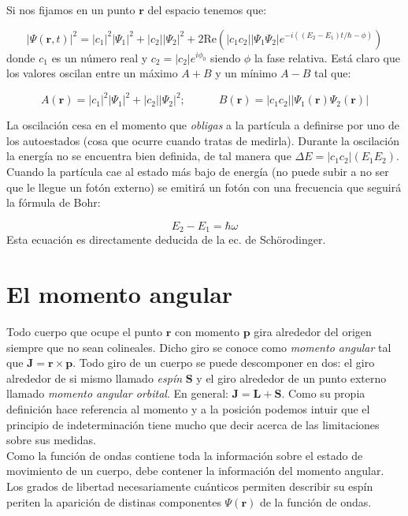 \documentclass[12pt]{article}
\newcommand{\parentesis}[1]{\left( #1  \right)}
\newcommand{\Real}{\mathrm{Re}}
\newcommand{\tquad}{\quad \quad \quad}
\newcommand{\rn}{\mathbf{r}}
\newcommand{\pn}{\mathbf{p}}
\newcommand{\Jn}{\mathbf{J}}
\newcommand{\Sn}{\mathbf{S}}
\newcommand{\Ln}{\mathbf{L}}
\begin{document}
Si nos fijamos en un punto $\rn$ del espacio tenemos que:

\begin{equation}
|\Psi (\rn,t)|^2 = |c_1|^2 |\Psi_1|^2 + |c_2||\Psi_2|^2 + 2 \Real \parentesis{|c_1 c_2|  |\Psi_1 \Psi_2| e^{-i( (E_2 - E_1)t/\hbar -\phi)}}
\end{equation}
donde $c_1$ es un número real y $c_2 = |c_2| e^{i \phi_0}$ siendo $\phi$ la fase relativa. Está claro que los valores oscilan entre un máximo $A+B$ y un mínimo $A-B$ tal que:

\begin{equation}
A(\rn) = |c_1|^2 |\Psi_1|^2 + |c_2||\Psi_2|^2 ;  \tquad B(\rn) = |c_1 c_2| |\Psi_1 (\rn) \Psi_2 (\rn)|
\end{equation}

La oscilación cesa en el momento que \textit{obligas} a la partícula a definirse por uno de los autoestados (cosa que ocurre cuando tratas de medirla). Durante la oscilación la energía no se encuentra bien definida, de tal manera que $\Delta E = |c_1 c_2 | (E_1 E_2)$. Cuando la partícula cae al estado más bajo de energía (no puede subir a no ser que le llegue un fotón externo) se emitirá un fotón con una frecuencia que seguirá la fórmula de Bohr:

\begin{equation}
E_2 - E_1  = \hbar \omega
\end{equation}
Esta ecuación es directamente deducida de la ec. de Schörodinger. 

\section{El momento angular}

Todo cuerpo que ocupe el punto $\rn$ con momento $\pn$ gira alrededor del origen siempre que no sean colineales. Dicho giro se conoce como \textit{momento angular} tal que $\Jn = \rn \times \pn$. Todo giro de un cuerpo se puede descomponer en dos: el giro alrededor de si mismo llamado \textit{espín} $\Sn$ y el giro alrededor de un punto externo llamado \textit{momento angular orbital}. En general: $\Jn = \Ln + \Sn$. Como su propia definición hace referencia al momento y a la posición podemos intuir que el principio de indeterminación tiene mucho que decir acerca de las limitaciones sobre sus medidas.\\

Como la función de ondas contiene toda la información sobre el estado de movimiento de un cuerpo, debe contener la información del momento angular. Los grados de libertad necesariamente cuánticos permiten describir su espín periten la aparición de distinas componentes $\Psi (\rn)$ de la función de ondas. \\
\end{document}
